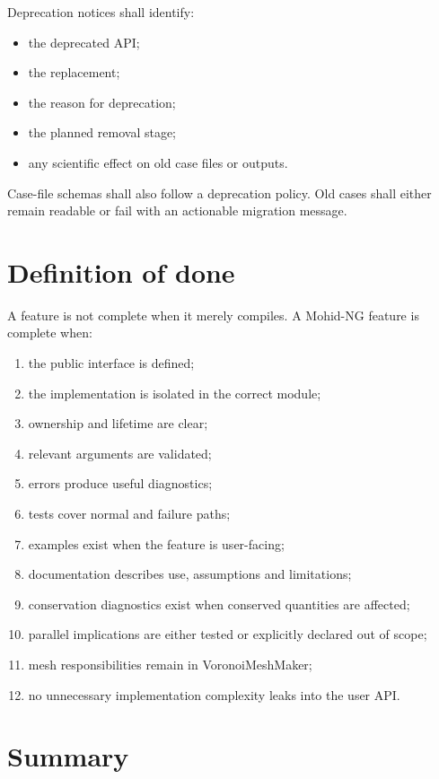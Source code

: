 \documentclass[11pt,a4paper]{article}
\begin{document}
Deprecation notices shall identify:

\begin{itemize}
  \item the deprecated API;
  \item the replacement;
  \item the reason for deprecation;
  \item the planned removal stage;
  \item any scientific effect on old case files or outputs.
\end{itemize}

Case-file schemas shall also follow a deprecation policy. Old cases shall either remain readable or fail with an actionable migration message.

\section{Definition of done}

A feature is not complete when it merely compiles. A Mohid-NG feature is complete when:

\begin{enumerate}
  \item the public interface is defined;
  \item the implementation is isolated in the correct module;
  \item ownership and lifetime are clear;
  \item relevant arguments are validated;
  \item errors produce useful diagnostics;
  \item tests cover normal and failure paths;
  \item examples exist when the feature is user-facing;
  \item documentation describes use, assumptions and limitations;
  \item conservation diagnostics exist when conserved quantities are affected;
  \item parallel implications are either tested or explicitly declared out of scope;
  \item mesh responsibilities remain in VoronoiMeshMaker;
  \item no unnecessary implementation complexity leaks into the user API.
\end{enumerate}

\section{Summary}
\end{document}
